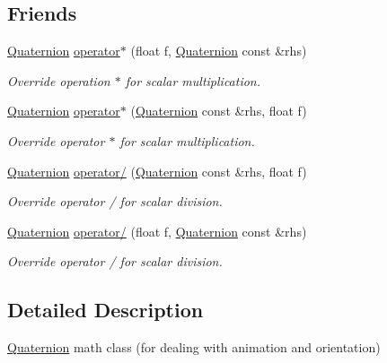 \subsection*{Friends}
\begin{DoxyCompactItemize}
\item 
\hyperlink{structMathUtil_1_1Quaternion}{Quaternion} \hyperlink{structMathUtil_1_1Quaternion_a047591b16ace29c20014c06c1e3f56ee}{operator$\ast$} (float f, \hyperlink{structMathUtil_1_1Quaternion}{Quaternion} const \&rhs)
\begin{DoxyCompactList}\small\item\em Override operation $\ast$ for scalar multiplication. \end{DoxyCompactList}\item 
\hyperlink{structMathUtil_1_1Quaternion}{Quaternion} \hyperlink{structMathUtil_1_1Quaternion_aecdc0f848a93cfe34ca8ca7b31024e27}{operator$\ast$} (\hyperlink{structMathUtil_1_1Quaternion}{Quaternion} const \&rhs, float f)
\begin{DoxyCompactList}\small\item\em Override operator $\ast$ for scalar multiplication. \end{DoxyCompactList}\item 
\hyperlink{structMathUtil_1_1Quaternion}{Quaternion} \hyperlink{structMathUtil_1_1Quaternion_af69cd135c1f4ef58d6dd242617108195}{operator/} (\hyperlink{structMathUtil_1_1Quaternion}{Quaternion} const \&rhs, float f)
\begin{DoxyCompactList}\small\item\em Override operator / for scalar division. \end{DoxyCompactList}\item 
\hyperlink{structMathUtil_1_1Quaternion}{Quaternion} \hyperlink{structMathUtil_1_1Quaternion_a241417eeb3a5c9d24697776ff3ba3dfc}{operator/} (float f, \hyperlink{structMathUtil_1_1Quaternion}{Quaternion} const \&rhs)
\begin{DoxyCompactList}\small\item\em Override operator / for scalar division. \end{DoxyCompactList}\end{DoxyCompactItemize}


\subsection{Detailed Description}
\hyperlink{structMathUtil_1_1Quaternion}{Quaternion} math class (for dealing with animation and orientation) 

